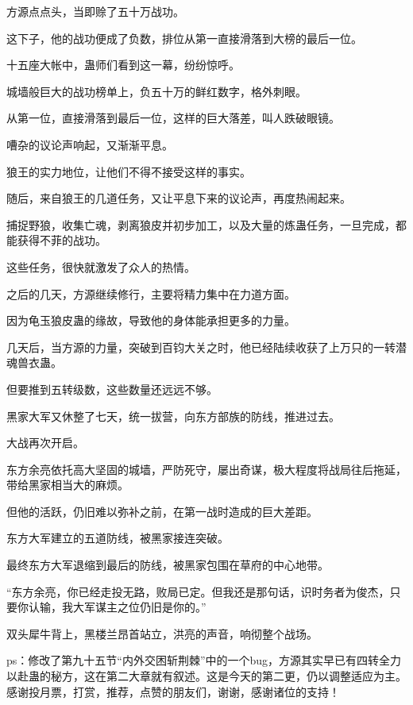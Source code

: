 \begin{this_body}
方源点点头，当即赊了五十万战功。

这下子，他的战功便成了负数，排位从第一直接滑落到大榜的最后一位。

十五座大帐中，蛊师们看到这一幕，纷纷惊呼。

城墙般巨大的战功榜单上，负五十万的鲜红数字，格外刺眼。

从第一位，直接滑落到最后一位，这样的巨大落差，叫人跌破眼镜。

嘈杂的议论声响起，又渐渐平息。

狼王的实力地位，让他们不得不接受这样的事实。

随后，来自狼王的几道任务，又让平息下来的议论声，再度热闹起来。

捕捉野狼，收集亡魂，剥离狼皮并初步加工，以及大量的炼蛊任务，一旦完成，都能获得不菲的战功。

这些任务，很快就激发了众人的热情。

之后的几天，方源继续修行，主要将精力集中在力道方面。

因为龟玉狼皮蛊的缘故，导致他的身体能承担更多的力量。

几天后，当方源的力量，突破到百钧大关之时，他已经陆续收获了上万只的一转潜魂兽衣蛊。

但要推到五转级数，这些数量还远远不够。

黑家大军又休整了七天，统一拔营，向东方部族的防线，推进过去。

大战再次开启。

东方余亮依托高大坚固的城墙，严防死守，屡出奇谋，极大程度将战局往后拖延，带给黑家相当大的麻烦。

但他的活跃，仍旧难以弥补之前，在第一战时造成的巨大差距。

东方大军建立的五道防线，被黑家接连突破。

最终东方大军退缩到最后的防线，被黑家包围在草府的中心地带。

“东方余亮，你已经走投无路，败局已定。但我还是那句话，识时务者为俊杰，只要你认输，我大军谋主之位仍旧是你的。”

双头犀牛背上，黑楼兰昂首站立，洪亮的声音，响彻整个战场。

ps：修改了第九十五节“内外交困斩荆棘”中的一个bug，方源其实早已有四转全力以赴蛊的秘方，这在第二大章就有叙述。这是今天的第二更，仍以调整适应为主。感谢投月票，打赏，推荐，点赞的朋友们，谢谢，感谢诸位的支持！

\end{this_body}

